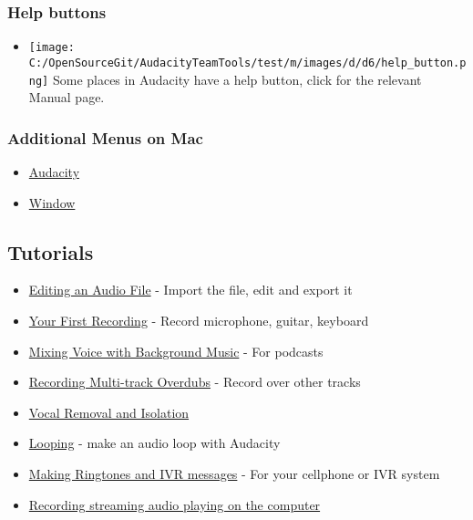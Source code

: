 \begin{multicols}{2}
\subsubsection{Help buttons}
\begin{itemize}
\item \texorpdfstring{\protect\texttt{[image: C:/OpenSourceGit/AudacityTeamTools/test/m/images/d/d6/help\_button.png]}}{} Some places in Audacity have a help button, click for the relevant Manual page.
\end{itemize}

\subsubsection{Additional Menus on Mac}
\begin{itemize}
\item 
\hyperref[\foo{man:audacity:menu:}]{Audacity}

\item 
\hyperref[\foo{man:window:menu:}]{Window}

\end{itemize}

\label{index:ref:bottom}
\subsection{Tutorials}
\label{index:tutorials}
\label{index:skiptheimage}
\begin{itemize}
\item 
\hyperref[\foo{man:tutorial:editing:an:existing:file:}]{Editing an Audio File}
 - Import the file, edit and export it
\item 
\hyperref[\foo{man:tutorial:your:first:recording:}]{Your First Recording}
 - Record microphone, guitar, keyboard
\item 
\hyperref[\foo{man:tutorial:mixing:a:narration:with:background:music:}]{Mixing Voice with Background Music}
 - For podcasts
\item 
\hyperref[\foo{man:tutorial:recording:multi:track:overdubs:}]{Recording Multi-track Overdubs}
 - Record over other tracks
\item 
\hyperref[\foo{man:tutorial:vocal:removal:and:isolation:}]{Vocal Removal and Isolation}

\item 
\hyperref[\foo{man:tutorial:looping:}]{Looping}
 - make an audio loop with Audacity
\item 
\hyperref[\foo{man:tutorial:making:ringtones:and:ivr:messages:}]{Making Ringtones and IVR messages}
 - For your cellphone or IVR system
\item 
\hyperref[\foo{man:tutorial:recording:audio:playing:on:the:computer:}]{Recording streaming audio playing on the computer}


\end{itemize}
\end{multicols}

